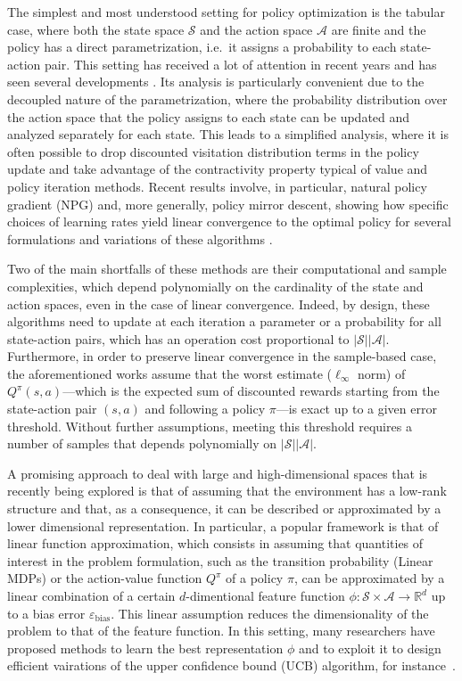 \documentclass[a4paper,12pt]{article}
\numberwithin{theorem}{section}
\newcommand\A{\mathcal{A}}
\newcommand\R{\mathbb{R}}
\renewcommand\S{\mathcal{S}}
\newcommand\1{\mathbf{1}}
\begin{document}
The simplest and most understood setting for policy optimization is the tabular case, where both the state space $\S$ and the action space $\A$ are finite and the policy has a direct parametrization,
i.e.\ it assigns a probability to each state-action pair. This setting has received a lot of attention in recent years and has seen several developments \citep{RN265, RN266}.
Its analysis is particularly convenient due to the decoupled nature of the parametrization, where the probability distribution over the action space that the policy assigns to each state can be updated and analyzed separately for each state.
This leads to a simplified analysis, where it is often possible to drop discounted visitation distribution terms in the policy update and take advantage of the contractivity property typical of value and policy iteration methods.
Recent results involve, in particular, natural policy gradient (NPG) and, more generally, policy mirror descent, showing how specific choices of learning rates yield linear convergence to the optimal policy for several formulations and variations of these algorithms \citep{RN150,RN242,RN268,RN266, RN269, RN270, RN273, RN272}.

Two of the main shortfalls of these methods are their computational and sample complexities, which depend polynomially on the cardinality of the state and action spaces, even in the case of linear convergence. Indeed, by design, these algorithms need to update at each iteration a parameter or a probability for all state-action pairs, which has an operation cost proportional to $|\S||\A|$. Furthermore, in order to preserve linear convergence in the sample-based case, the aforementioned works assume that the worst estimate ($\ell_\infty$ norm) of $Q^\pi(s,a)$---which is the expected sum of discounted rewards starting from the state-action pair $(s,a)$ and following a policy $\pi$---is exact up to a given error threshold. Without further assumptions, meeting this threshold requires a number of samples that depends polynomially on $|\S||\A|$.

A promising approach to deal with large and high-dimensional spaces that is recently being explored is that of assuming that the environment has a low-rank structure and that, as a consequence, it can be described or approximated by a lower dimensional representation. 
In particular, a popular framework is that of linear function approximation, which consists in assuming that quantities of interest in the problem formulation, such as the transition probability (Linear MDPs) or the action-value function $Q^\pi$ of a policy $\pi$, can be approximated by a linear combination of a certain $d$-dimentional feature function $\phi:\S\times\A\rightarrow\R^d$ up to a bias error $\varepsilon_\text{bias}$. This linear assumption reduces the dimensionality of the problem to that of the feature function.
In this setting, many researchers have proposed methods to learn the best representation $\phi$ \citep{RN220, RN236, RN240, RN276} and to exploit it to design efficient vairations of the upper confidence bound (UCB) algorithm, for instance~\citep{RN162, RN237, RN275}.
\end{document}
